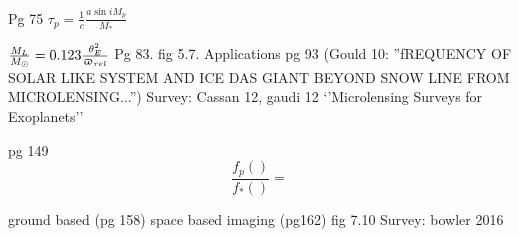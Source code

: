 \begin{workout}
Pg 75
$\tau_p=\frac{1}{c}\frac{a\sin{i}M_p}{M_*}$
\end{workout}

\begin{workout}[Microlensing]
$\frac{M_L}{M_{\odot}{}}=0.123\frac{\theta_E^2}{\upvarpi_{rel}}$
Pg 83. fig 5.7. Applications pg 93
(Gould 10: ''fREQUENCY OF SOLAR LIKE SYSTEM AND ICE DAS GIANT BEYOND SNOW LINE FROM MICROLENSING...'')
Survey: Cassan 12, gaudi 12 `'Microlensing Surveys for Exoplanets''
\end{workout}



\begin{workout}
pg 149
\begin{equation*}
\frac{f_p()}{f_*()}=
\end{equation*}
\end{workout}
\begin{workout}
ground based (pg 158) space based imaging (pg162)
fig 7.10
Survey: bowler 2016
\end{workout}